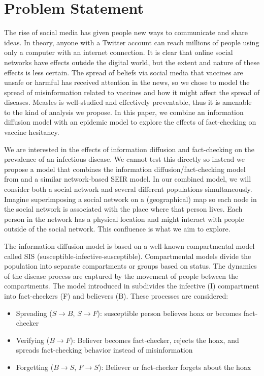 \documentclass[conference]{IEEEtran}
\begin{document}
\section{Problem Statement} %
The rise of social media has given people new ways to communicate and share ideas. In theory, anyone with a Twitter account can reach millions of people using only a computer with an internet connection. It is clear that online social networks have effects outside the digital world, but the extent and nature of these effects is less certain. The spread of beliefs via social media that vaccines are unsafe or harmful has received attention in the news, so we chose to model the spread of misinformation related to vaccines and how it might affect the spread of diseases. Measles is well-studied and effectively preventable, thus it is amenable to the kind of analysis we propose. In this paper, we combine an information diffusion model with an epidemic model to explore the effects of fact-checking on vaccine hesitancy.

We are interested in the effects of information diffusion and fact-checking on the prevalence of an infectious disease. We cannot test this directly so instead we propose a model that combines the information diffusion/fact-checking model from \cite{Tambuscio15} and a similar network-based SEIR model. In our combined model, we will consider both a social network and several different populations simultaneously. Imagine superimposing a social network on a (geographical) map so each node in the social network is associated with the place where that person lives. Each person in the network has a physical location and might interact with people outside of the social network. This confluence is what we aim to explore.

The information diffusion model is based on a well-known compartmental model called SIS (susceptible-infective-susceptible). Compartmental models divide the population into separate compartments or groups based on status. The dynamics of the disease process are captured by the movement of people between the compartments.\cite{Hethcote2000TheMO} The model introduced in \cite{Tambuscio15} subdivides the infective (I) compartment into fact-checkers (F) and believers (B). These processes are considered:
\begin{itemize}
    \item Spreading ($S \rightarrow B$, $S \rightarrow F$): susceptible person believes hoax or becomes fact-checker
    \item Verifying ($B \rightarrow F$): Believer becomes fact-checker, rejects the hoax, and spreads fact-checking behavior instead of misinformation
    \item Forgetting ($B \rightarrow S$, $F \rightarrow S$): Believer or fact-checker forgets about the hoax
\end{itemize}
\end{document}
